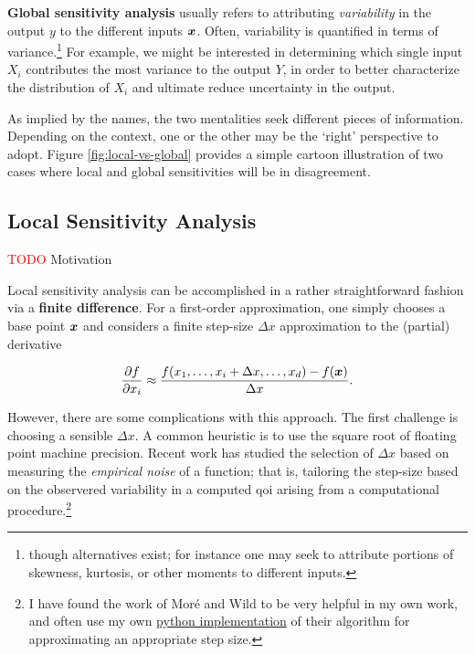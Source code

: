 \documentclass[../primer.tex]{subfiles}
\begin{document}
\textbf{Global sensitivity analysis} usually refers to attributing
\emph{variability} in the output $y$ to the different inputs $\boldsymbol{x}$. Often,
variability is quantified in terms of variance.\footnote{though alternatives
  exist; for instance one may seek to attribute portions of skewness, kurtosis,
  or other moments to different inputs.\cite{owen2014higher}} For example, we
might be interested in determining which single input $X_i$ contributes the most
variance to the output $Y$, in order to better characterize the distribution of
$X_i$ and ultimate reduce uncertainty in the output.

As implied by the names, the two mentalities seek different pieces of
information. Depending on the context, one or the other may be the `right'
perspective to adopt. Figure \ref{fig:local-vs-global} provides a simple cartoon
illustration of two cases where local and global sensitivities will be in
disagreement.

\subsection{Local Sensitivity Analysis}
\textcolor{red}{TODO} Motivation

Local sensitivity analysis can be accomplished in a rather straightforward
fashion via a \textbf{finite difference}. For a first-order approximation, one
simply chooses a base point $\boldsymbol{x}$ and considers a finite step-size $\Delta x$
approximation to the (partial) derivative

\begin{equation}
  \frac{\partial f}{\partial x_i} \approx \frac{f(x_1,\dots,x_i+\Delta
    x,\dots,x_d) - f(\boldsymbol{x})}{\Delta x}.
\end{equation}

However, there are some complications with this approach. The first challenge is
choosing a sensible $\Delta x$. A common heuristic is to use the square root of
floating point machine precision. Recent work has studied the selection of
$\Delta x$ based on measuring the \emph{empirical noise} of a function; that is,
tailoring the step-size based on the observered variability in a computed qoi
arising from a computational procedure.\cite{more2012}\footnote{I have found the
  work of Mor{\'e} and Wild to be very helpful in my own work, and often use my
  own \href{https://github.com/zdelrosario/pyutil}{python implementation} of
  their algorithm for approximating an appropriate step size.}
\end{document}
